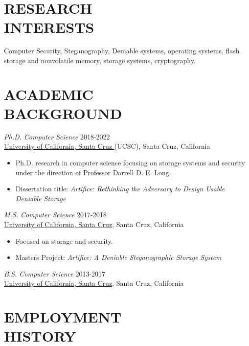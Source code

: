\documentclass[margin, 10pt]{res} %
\begin{document}
\begin{resume}

 
\section{RESEARCH \\ INTERESTS}
 
Computer Security, Steganography, Deniable systems, operating systems, flash storage and nonvolatile memory, storage systems, cryptography.
 
\section{ACADEMIC \\ BACKGROUND}

{\sl Ph.D. Computer Science} \hfill 2018-2022 \\
\href{https://www.ucsc.edu/}{University of California, Santa Cruz } (UCSC), Santa Cruz, California
\begin{itemize}
\item Ph.D. research in computer science focusing on storage systems and security under the 
direction of Professor Darrell D. E. Long.
\item Dissertation title: \emph{Artifice: Rethinking the Adversary to Design Usable Deniable Storage}
\end{itemize} 

{\sl M.S. Computer Science} \hfill 2017-2018 \\
\href{http://www.ucsc.edu}{University of California, Santa Cruz}, Santa Cruz, California
\begin{itemize}
\item Focused on storage and security.
\item Masters Project: \emph{Artifice: A Deniable Steganographic Storage System}
\end{itemize} 

{\sl B.S. Computer Science} \hfil 2013-2017 \\
\href{http://www.ucsc.edu}{University of California, Santa Cruz}, Santa Cruz, California


\section{EMPLOYMENT \\HISTORY}


\end{resume}
\end{document}
